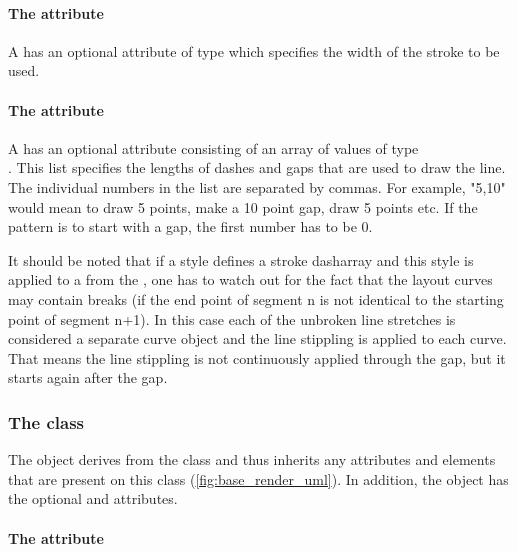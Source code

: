 \paragraph{The \fixttspace{} attribute}

A \GraphicalPrimitiveOneD has an optional attribute 
of type  which specifies the width of the stroke to be used.

\paragraph{The \fixttspace{} attribute}

A \GraphicalPrimitiveOneD has an optional attribute
 consisting of an array of values of type \\ . This list specifies the lengths of dashes and 
gaps that are used to draw the line. The individual numbers in the list are separated by commas. 
For example,  "5,10" would mean to draw 5 points, make a 10 point gap, draw 5 points etc. If the pattern is to start with a gap, the first number has to be 0.

It should be noted that if a style defines a stroke dasharray and this style is applied to a  from the \LayoutPackage, one has to watch out for the fact that the layout curves may contain breaks (if the end point of segment n is not identical to the starting point of segment n+1). In this case each of the unbroken line stretches is considered a separate curve object and the line stippling is applied to each curve. That means the line stippling is not continuously applied through the gap, but it starts again after the gap.


\subsubsection{The  class}
\label{graphicalprimitivetwod-class}

The \GraphicalPrimitiveTwoD object derives from the
\GraphicalPrimitiveOneD class and thus inherits any attributes and
elements that are present on this class (\ref{fig:base_render_uml}).
In addition, the \GraphicalPrimitiveTwoD object has the optional  and  attributes.

\paragraph{The \fixttspace{} attribute}

